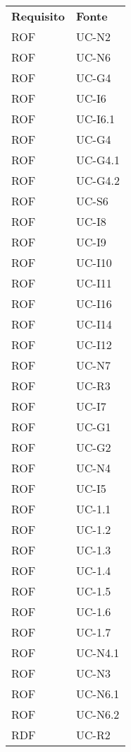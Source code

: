 \begin{longtable}{| p{5cm} | p{5cm} |}
		\rowcolor{LightBlue}
		\color{white}\bfseries Requisito & \color{white}\bfseries Fonte \\[0.25cm]
		\rowcolor{LightGray}
		ROF & UC-N2\\
		ROF & UC-N6\\
		\rowcolor{LightGray}
		ROF & UC-G4\\
		ROF & UC-I6\\
		\rowcolor{LightGray}
		ROF & UC-I6.1\\
		ROF & UC-G4\\
		\rowcolor{LightGray}
		ROF & UC-G4.1\\
		ROF & UC-G4.2\\
		\rowcolor{LightGray}
		ROF & UC-S6\\
		ROF & UC-I8\\
		\rowcolor{LightGray}
		ROF & UC-I9\\
		ROF & UC-I10\\
		\rowcolor{LightGray}
		ROF & UC-I11\\
		ROF & UC-I16\\
		\rowcolor{LightGray}
		ROF & UC-I14\\
		ROF & UC-I12\\
		\rowcolor{LightGray}
		ROF & UC-N7\\
		ROF & UC-R3\\
		\rowcolor{LightGray}
		ROF & UC-I7\\
		ROF & UC-G1\\
		\rowcolor{LightGray}
		ROF & UC-G2\\
		ROF & UC-N4\\
		\rowcolor{LightGray}
		ROF & UC-I5\\
		ROF & UC-1.1\\
		\rowcolor{LightGray}
		ROF & UC-1.2\\
		ROF & UC-1.3\\
		\rowcolor{LightGray}
		ROF & UC-1.4\\
		ROF & UC-1.5\\
		\rowcolor{LightGray}
		ROF & UC-1.6\\
		ROF & UC-1.7\\
		\rowcolor{LightGray}
		ROF & UC-N4.1\\
		ROF & UC-N3\\
		\rowcolor{LightGray}
		ROF & UC-N6.1\\
		ROF & UC-N6.2\\
		\rowcolor{LightGray}
		RDF & UC-R2\\

\end{longtable}
